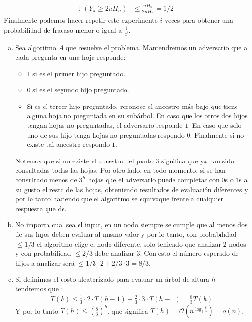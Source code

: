 \documentclass[dcc,uchile]{fcfmcourse}
\theoremstyle{plain}
\theoremstyle{definition}
\begin{document}
\begin{problems}
\begin{enumerate}[a)]
\begin{align*}
        \mathbb{P}(Y_{n} \ge 2nH_{n} ) &\le \frac{nH_{n}}{2nH_{n}} = 1/2
    \end{align*}
    Finalmente podemos hacer repetir este experimento $i$ veces para obtener una probabilidad de fracaso menor o igual a $\frac{1}{2^{i}}$.
\end{enumerate}
\problem 
\begin{enumerate}[a)]
    \item  Sea algoritmo $A$ que resuelve el problema. Mantendremos un adversario \demon que a cada pregunta en una hoja responde:
    \begin{itemize}
        \item $1$ si es el primer hijo preguntado.
        \item $0$ si es el segundo hijo preguntado.
        \item Si es el tercer hijo preguntado, reconoce el ancestro más bajo que tiene alguna hoja no preguntada en su subárbol. En caso que los otros dos hijos tengan hojas no preguntadas, el adversario responde $1$. En caso que solo uno de sus hijo tenga hojas no preguntadas respondo $0$. Finalmente si no existe tal ancestro respondo $1$.
    \end{itemize}
    Notemos que si no existe el ancestro del punto 3 significa que ya han sido consultadas todas las hojas. Por otro lado, en todo momento, si se han consultado menos de $3^h$ hojas que el adversario puede completar con $0$s o $1$s a su gusto el resto de las hojas, obteniendo resultados de evaluación diferentes y por lo tanto haciendo que el algoritmo se equivoque frente a cualquier respuesta que de.
    \item No importa cual sea el input, en un nodo siempre se cumple que al menos dos de sus hijos deben evaluar al mismo valor y por lo tanto, con probabilidad $\le 1/3$ el algoritmo elige el nodo diferente, solo teniendo que analizar $2$ nodos y con probabilidad $\le 2/3$ debe analizar $3$. Con esto el número esperado de hijos a analizar será $\le 1/3 \cdot 2 + 2/3 \cdot 3 = 8/3$.
    \item Si definimos el costo aleatorizado para evaluar un árbol de altura $h$ tendremos que :
    \begin{align*}
        T(h) \le \frac{1}{3}\cdot 2 \cdot T(h-1) + \frac{2}{3}\cdot 3 \cdot T(h-1) = \frac{8}{3}T(h)
    \end{align*}
    Y por lo tanto $T(h) \le \left(\frac{8}{3}\right)^{h}$, que significa $T(h) = \mathcal{O}\left(n^{\log_{3}{\frac{8}{3}}}\right) = o(n)$.
\end{enumerate}

\end{problems}
\end{document}
